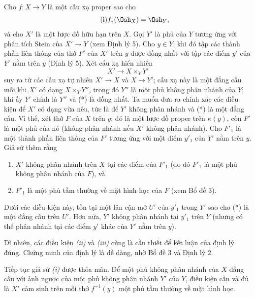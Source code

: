 Cho $f:X\longrightarrow Y$ là một cấu xạ proper sao cho
\begin{equation}
  \tag{i}
  f_*(\Osh_X)=\Osh_Y,
\end{equation}
và cho $X'$ là một lược đồ hữu hạn trên $X$. Gọi $Y'$ là phủ của $Y$ tương ứng
với phân tích Stein của $X'\longrightarrow Y$ (xem Định lý 5). Cho $y\in Y$;
khi đó tập các thành phần liên thông của thớ $F'$ của $X'$ trên $y$ được đồng
nhất với tập các điểm $y'$ của $Y'$ nằm trên $y$ (Định lý 5). Xét cấu xạ hiển
nhiên
\begin{equation}
  \tag{*}
  X'\longrightarrow X\times_Y Y'
\end{equation}
suy ra từ các cấu xạ tự nhiên $X'\longrightarrow X$ và
$X\longrightarrow Y'$; cấu xạ này là một
đẳng cấu mỗi khi $X'$ có dạng $X\times_Y Y''$, trong đó $Y''$ là một phủ không
phân nhánh của $Y$; khi ấy $Y'$ chính là $Y''$ và (*) là đồng nhất. Ta muốn
đưa ra chính xác các điều kiện để $X'$ có dạng vừa nêu, tức là để $Y'$ không
phân nhánh và (*) là một đẳng cấu. Vì thế, xét thớ $F$ của $X$ trên $y$; đó là
một lược đồ proper trên $\kappa(y)$, còn $F'$ là một phủ của nó (không phân
nhánh nếu $X'$ không phân nhánh). Cho $F'_1$ là một thành phần liên thông của
$F'$ tương ứng với một điểm $y'_1$ của $Y'$ nằm trên $y$. Giả sử thêm rằng
\begin{enumerate}
  \item[\textit{(ii)}] $X'$ không phân nhánh trên $X$ tại các điểm của $F'_1$
    (do đó $F'_1$ là một phủ không phân nhánh của $F$), và
  \item[\textit{(iii)}] $F'_1$ là một phủ tầm thường về mặt hình học của $F$
    (xem Bổ đề 3).
\end{enumerate}

 Dưới các điều kiện này, tồn tại một lân cận mở $U'$ của
$y'_1$ trong $Y'$ sao cho (*) là một đẳng cấu trên $U'$. Hơn nữa, $Y'$ không
phân nhánh tại $y'_1$ trên $Y$ (nhưng có thể phân nhánh tại các điểm $y'$ khác
của $Y'$ nằm trên $y$).

Dĩ nhiên, các điều kiện \textit{(ii)} và \textit{(iii)} cũng là cần thiết để
kết luận của định lý đúng. Chứng minh của định lý là dễ dàng, nhờ Bổ đề 3 và
Định lý 2.


 Tiếp tục giả sử \textit{(i)} được thỏa mãn. Để một phủ
không phân nhánh của $X$ đẳng cấu với ảnh ngược của một phủ không phân
nhánh $Y'$ của $Y$, điều kiện cần và đủ là $X'$ cảm sinh trên mỗi thớ
$f^{-1}(y)$ một phủ tầm thường về mặt hình học.

